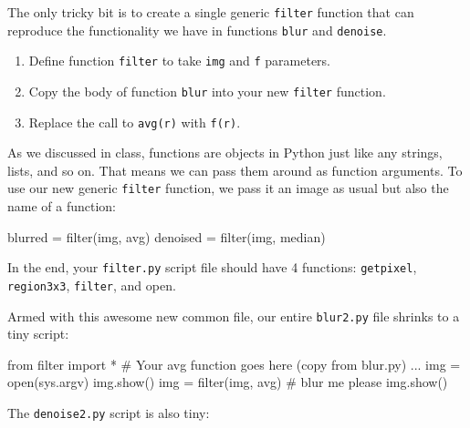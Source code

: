 \documentclass[titlepage]{tufte-book}
\begin{document}
The only tricky bit is to create a single generic {\tt filter} function that can reproduce the functionality we have in functions {\tt blur} and {\tt denoise}.

\begin{enumerate}
\item Define function {\tt filter} to take {\tt img} and {\tt f} parameters.
\item Copy the body of function {\tt blur} into your new {\tt filter} function.
\item Replace the call to {\tt avg(r)} with {\tt f(r)}.
\end{enumerate}

As we discussed in class, functions are objects in Python just like any strings, lists, and so on. That means we can pass them around as function arguments. To use our new generic {\tt filter} function, we pass it an image as usual but also the name of a function:

\begin{pyverbatim}
blurred  = filter(img, avg)
denoised = filter(img, median)
\end{pyverbatim}

In the end, your {\tt filter.py} script file should have 4 functions: {\tt getpixel}, {\tt region3x3}, {\tt filter}, and {open}.

Armed with this awesome new common file, our entire {\tt blur2.py} file shrinks to a tiny script:

\begin{pyverbatim}
from filter import *
# Your avg function goes here (copy from blur.py)
...
img = open(sys.argv)
img.show()
img = filter(img, avg)		# blur me please
img.show()
\end{pyverbatim}

\noindent The {\tt denoise2.py} script is also tiny:
\end{document}

